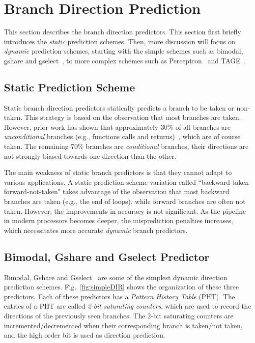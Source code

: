 \section{Branch Direction Prediction}
\label{sec:background:dirpred}
This section describes the branch direction predictors. This section first briefly introduces the \textit{static} prediction schemes. Then, more discussion will focus on \textit{dynamic} prediction schemes, starting with the simple schemes such as bimodal, gshare and gselect~\cite{McFarling}, to more complex schemes such as Perceptron~\cite{perceptron} and TAGE~\cite{tage}.

\subsection{Static Prediction Scheme}
\label{sec:background:dirpred:static}
Static branch direction predictors statically predicts a branch to be taken or non-taken. This strategy is based on the observation that most branches are taken. However, prior work has shown that approximately 30\% of all branches are \textit{unconditional} branches (e.g., functions calls and returns)~\cite{histogram}, which are of course taken. The remaining 70\% branches are \textit{conditional} branches, their directions are not strongly biased towards one direction than the other.

The main weakness of static branch predictors is that they cannot adapt to various applications. A static prediction scheme variation called ``backward-taken forward-not-taken" takes advantage of the observation that most backward branches are taken (e.g., the end of loops), while forward branches are often not taken. However, the improvements in accuracy is not significant. As the pipeline in modern processors becomes deeper, the misprediction penalties increases, which necessitates more accurate \textit{dynamic} branch predictors.

\subsection{Bimodal, Gshare and Gselect Predictor}
\label{sec:background:dirpred:bimodal}
Bimodal, Gshare and Gselect~\cite{McFarling} are some of the simplest dynamic direction prediction schemes. Fig.~\ref{fig:simpleDIR} shows the organization of these three predictors. Each of these predictors has a \textit{Pattern History Table} (PHT). The entries of a PHT are called \textit{2-bit saturating counters}, which are used to record the directions of the previously seen branches. The 2-bit saturating counters are incremented/decremented when their corresponding branch is taken/not taken, and the high order bit is used as direction prediction.

